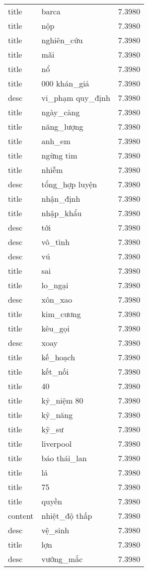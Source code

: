 \documentclass{article}
\begin{document}
\begin{tabular}{lll}
title & barca & 7.3980\\
title & nộp & 7.3980\\
title & nghiên\_cứu & 7.3980\\
title & mãi & 7.3980\\
title & nổ & 7.3980\\
title & 000 khán\_giả & 7.3980\\
desc & vi\_phạm quy\_định & 7.3980\\
title & ngày\_càng & 7.3980\\
title & năng\_lượng & 7.3980\\
title & anh\_em & 7.3980\\
title & ngừng tim & 7.3980\\
title & nhiễm & 7.3980\\
desc & tổng\_hợp luyện & 7.3980\\
title & nhận\_định & 7.3980\\
title & nhập\_khẩu & 7.3980\\
desc & tới & 7.3980\\
desc & vô\_tình & 7.3980\\
desc & vú & 7.3980\\
title & sai & 7.3980\\
title & lo\_ngại & 7.3980\\
desc & xôn\_xao & 7.3980\\
title & kim\_cương & 7.3980\\
title & kêu\_gọi & 7.3980\\
desc & xoay & 7.3980\\
title & kế\_hoạch & 7.3980\\
title & kết\_nối & 7.3980\\
title & 40 & 7.3980\\
title & kỷ\_niệm 80 & 7.3980\\
title & kỹ\_năng & 7.3980\\
title & kỹ\_sư & 7.3980\\
title & liverpool & 7.3980\\
title & báo thái\_lan & 7.3980\\
title & lá & 7.3980\\
title & 75 & 7.3980\\
title & quyền & 7.3980\\
content & nhiệt\_độ thấp & 7.3980\\
desc & vệ\_sinh & 7.3980\\
title & lợn & 7.3980\\
desc & vướng\_mắc & 7.3980\\

\end{tabular}
\end{document}
